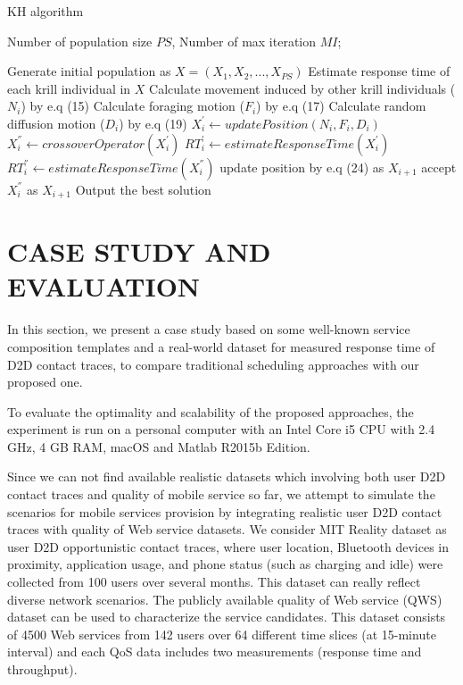\documentclass[journal]{IEEEtran}
\begin{document}
\begin{algorithm}
\caption{KH algorithm}
\label{alg2}
\begin{algorithmic}[1]

\REQUIRE Number of population size $PS$, Number of max iteration $MI$;

\STATE Generate initial population as $X = (X_1, X_2, ..., X_{PS})$
\STATE Estimate response time of each krill individual in $X$
    \STATE Calculate movement induced by other krill individuals ($N_i$) by e.q (15)
    \STATE Calculate foraging motion ($F_i$) by e.q (17)
    \STATE Calculate random diffusion motion ($D_i$) by e.q (19)
    \STATE $X_i^{'} \leftarrow updatePosition(N_i,F_i,D_i)$
    \STATE $X_i^{''} \leftarrow crossoverOperator(X_i^{'})$
    \STATE $RT_i^{'} \leftarrow estimateResponseTime(X_i^{'})$
    \STATE $RT_i^{''} \leftarrow estimateResponseTime(X_i^{''})$
      \STATE update position by e.q (24) as $X_{i+1}$
    \ELSE
      \STATE accept $X_i^{''}$ as $X_{i+1}$
    \ENDIF
  \ENDFOR
\ENDFOR
\STATE Output the best solution
\end{algorithmic}
\end{algorithm}


\section{CASE STUDY AND EVALUATION}
In this section, we present a case study based on some well-known service composition templates and a real-world dataset for measured response time of D2D contact traces, to compare traditional scheduling approaches with our proposed one.

To evaluate the optimality and scalability of the proposed approaches, the experiment is run on a personal computer with an Intel Core i5 CPU with 2.4 GHz, 4 GB RAM, macOS and Matlab R2015b Edition.

Since we can not find available realistic datasets which involving both user D2D contact traces and quality of mobile service so far, we attempt to simulate the scenarios for mobile services provision by integrating realistic user D2D contact traces with quality of Web service datasets. 
We consider MIT Reality dataset \cite{eagle2006reality} as user D2D opportunistic contact traces, where user location, Bluetooth devices in proximity, application usage, and phone status (such as charging and idle) were collected from 100 users over several months. This dataset can really reflect diverse network scenarios.
The publicly available quality of Web service (QWS) dataset\cite{zheng2014investigating} can be used to characterize the service candidates. This dataset consists of 4500 Web services from 142 users over 64 different time slices (at 15-minute interval) and each QoS data includes two measurements (response time and throughput).
\end{document}
